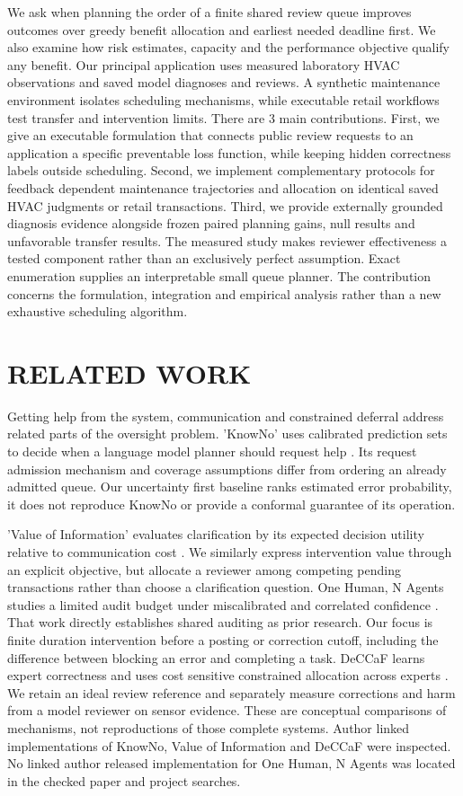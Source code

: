 We ask when planning the order of a finite shared review queue improves outcomes over greedy benefit allocation and earliest needed deadline first. We also examine how risk estimates, capacity and the performance objective qualify any benefit. Our principal application uses measured laboratory HVAC observations and saved model diagnoses and reviews. A synthetic maintenance environment isolates scheduling mechanisms, while executable retail workflows test transfer and intervention limits.
There are 3 main contributions. First, we give an executable formulation that connects public review requests to an application a specific preventable loss function, while keeping hidden correctness labels outside scheduling. Second, we implement complementary protocols for feedback dependent maintenance trajectories and allocation on identical saved HVAC judgments or retail transactions. Third, we provide externally grounded diagnosis evidence alongside frozen paired planning gains, null results and unfavorable transfer results. The measured study makes reviewer effectiveness a tested component rather than an exclusively perfect assumption. Exact enumeration supplies an interpretable small queue planner. The contribution concerns the formulation, integration and empirical analysis rather than a new exhaustive scheduling algorithm.

\section{RELATED WORK}
\noindent Getting help from the system, communication and constrained deferral address related parts of the oversight problem. 'KnowNo' uses calibrated prediction sets to decide when a language model planner should request help \cite{ren2023knowno}. Its request admission mechanism and coverage assumptions differ from ordering an already admitted queue. Our uncertainty first baseline ranks estimated error probability, it does not reproduce KnowNo or provide a conformal guarantee of its operation.

'Value of Information' evaluates clarification by its expected decision utility relative to communication cost \cite{dong2026voi}. We similarly express intervention value through an explicit objective, but allocate a reviewer among competing pending transactions rather than choose a clarification question. One Human, N Agents studies a limited audit budget under miscalibrated and correlated confidence \cite{zavattari2026onehuman}. That work directly establishes shared auditing as prior research. Our focus is finite duration intervention before a posting or correction cutoff, including the difference between blocking an error and completing a task.
DeCCaF learns expert correctness and uses cost sensitive constrained allocation across experts \cite{alves2024deccaf}. We retain an ideal review reference and separately measure corrections and harm from a model reviewer on sensor evidence. These are conceptual comparisons of mechanisms, not reproductions of those complete systems. Author linked implementations of KnowNo, Value of Information and DeCCaF were inspected. No linked author released implementation for One Human, N Agents was located in the checked paper and project searches.

